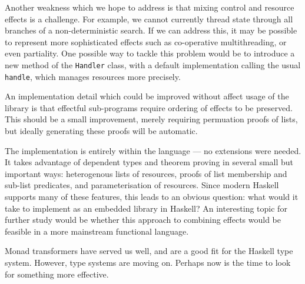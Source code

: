 Another weakness which we hope to address is that mixing
control and resource effects is a challenge. For example, we cannot
currently thread state through all branches of a non-deterministic search.
If we can address this, it may be possible to represent more sophisticated
effects such as co-operative multithreading, or even partiality.
One possible way to tackle this problem would be to introduce a new method
of the \texttt{Handler} class, with a default implementation calling the
usual \texttt{handle}, which manages resources more precisely.

An implementation detail which could be improved without affect usage of
the library is that effectful sub-programs require ordering of effects
to be preserved. This should be a small improvement, merely requiring permuation
proofs of lists, but ideally generating these proofs will be automatic.

The \Eff{} implementation is entirely within the \Idris{} language --- no
extensions were needed. It takes advantage of dependent types and theorem
proving in several small but important ways: heterogenous lists of resources,
proofs of list membership and sub-list predicates, and parameterisation of
resources. Since modern Haskell supports many of these features, this leads
to an obvious question: what would it take to implement \Eff{} as an embedded
library in Haskell? An interesting topic for further study would be whether
this approach to combining effects would be feasible in a more mainstream
functional language.

Monad transformers have served us well, and are a good fit for the Haskell
type system. However, type systems are moving on. Perhaps now is the time to
look for something more effective.

